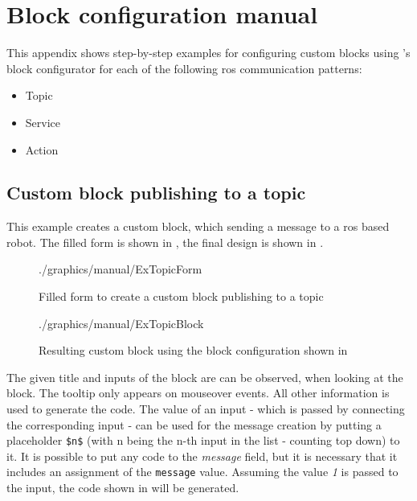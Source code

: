 \chapter{Block configuration manual} \label{apx:BlockConfigManual}
This appendix shows step-by-step examples for configuring custom blocks using \toolname{}'s block configurator for each of the following \gls{ros} communication patterns:
\begin{itemize}
    \item Topic
    \item Service
    \item Action
\end{itemize}

\section*{Custom block publishing to a topic} \label{sec:CustomTopic}
This example creates a custom block, which sending a message to a \gls{ros} based robot. The filled form is shown in , the final design is shown in .

\begin{figure}[htbp]
	\centering
	\begin{overpic}[width=\linewidth]{./graphics/manual/ExTopicForm}
	\end{overpic}
	\caption{Filled form to create a custom block publishing to a topic}%
	\label{fig:ExTopicForm}%
\end{figure}

\begin{figure}[htbp]
	\centering
	\begin{overpic}[width=0.2\linewidth]{./graphics/manual/ExTopicBlock}
	\end{overpic}
	\caption{Resulting custom block using the block configuration shown in }%
	\label{fig:ExTopicBlock}%
\end{figure}

\begin{figure}[h]
	
\end{figure}

The given title and inputs of the block are can be observed, when looking at the block. The tooltip only appears on mouseover events. All other information is used to generate the code. The value of an input - which is passed by connecting the corresponding input - can be used for the message creation by putting a placeholder \lstinline!$n$! (with n being the n-th input in the list - counting top down) to it. It is possible to put any code to the \textit{message} field, but it is necessary that it includes an assignment of the \lstinline!message! value. Assuming the value \textit{1} is passed to the \textit{\metres} input, the code shown in  will be generated.

